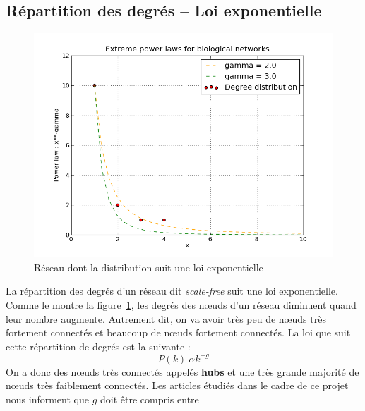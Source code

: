 \subsection{Répartition des degrés -- Loi exponentielle}
\begin{figure}[!h]
\includegraphics[width=\linewidth]{plot.png}
\caption{Réseau dont la distribution suit une loi exponentielle}
\label{scalefree}
\end{figure}
La répartition des degrés d'un réseau dit \textit{scale-free} suit une loi exponentielle. Comme le montre la figure~\ref{scalefree}, les degrés des nœuds d'un réseau diminuent quand leur nombre augmente. Autrement dit, on va avoir très peu de nœuds très fortement connectés et beaucoup de nœuds fortement connectés. La loi que suit cette répartition de degrés est la suivante :
$$ P(k) ~ \alpha k^{-g} $$
On a donc des nœuds très connectés appelés \textbf{hubs} et une très grande majorité de nœuds très faiblement connectés.	Les articles étudiés dans le cadre de ce projet nous informent que $g$ doit être compris entre 

%




